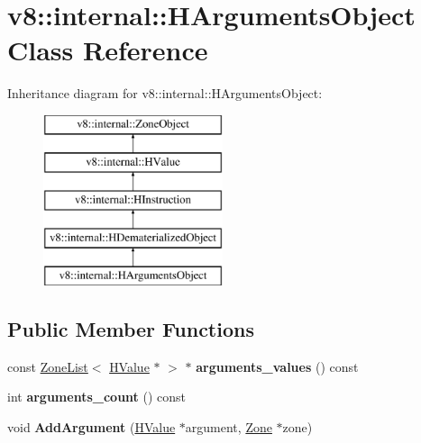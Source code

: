 \hypertarget{classv8_1_1internal_1_1_h_arguments_object}{}\section{v8\+:\+:internal\+:\+:H\+Arguments\+Object Class Reference}
\label{classv8_1_1internal_1_1_h_arguments_object}
Inheritance diagram for v8\+:\+:internal\+:\+:H\+Arguments\+Object\+:\begin{figure}[H]
\begin{center}
\leavevmode
\includegraphics[height=5.000000cm]{classv8_1_1internal_1_1_h_arguments_object}
\end{center}
\end{figure}
\subsection*{Public Member Functions}
\begin{DoxyCompactItemize}
\item 
const \hyperlink{classv8_1_1internal_1_1_zone_list}{Zone\+List}$<$ \hyperlink{classv8_1_1internal_1_1_h_value}{H\+Value} $\ast$ $>$ $\ast$ {\bfseries arguments\+\_\+values} () const \hypertarget{classv8_1_1internal_1_1_h_arguments_object_aaead65545d47aad5aad0d73c64a29a3d}{}\label{classv8_1_1internal_1_1_h_arguments_object_aaead65545d47aad5aad0d73c64a29a3d}

\item 
int {\bfseries arguments\+\_\+count} () const \hypertarget{classv8_1_1internal_1_1_h_arguments_object_a1c8462c2cd7fd193031eb802f23099c6}{}\label{classv8_1_1internal_1_1_h_arguments_object_a1c8462c2cd7fd193031eb802f23099c6}

\item 
void {\bfseries Add\+Argument} (\hyperlink{classv8_1_1internal_1_1_h_value}{H\+Value} $\ast$argument, \hyperlink{classv8_1_1internal_1_1_zone}{Zone} $\ast$zone)\hypertarget{classv8_1_1internal_1_1_h_arguments_object_a40a165d0586df389ea9e1b6d79c3190e}{}\label{classv8_1_1internal_1_1_h_arguments_object_a40a165d0586df389ea9e1b6d79c3190e}

\end{DoxyCompactItemize}
